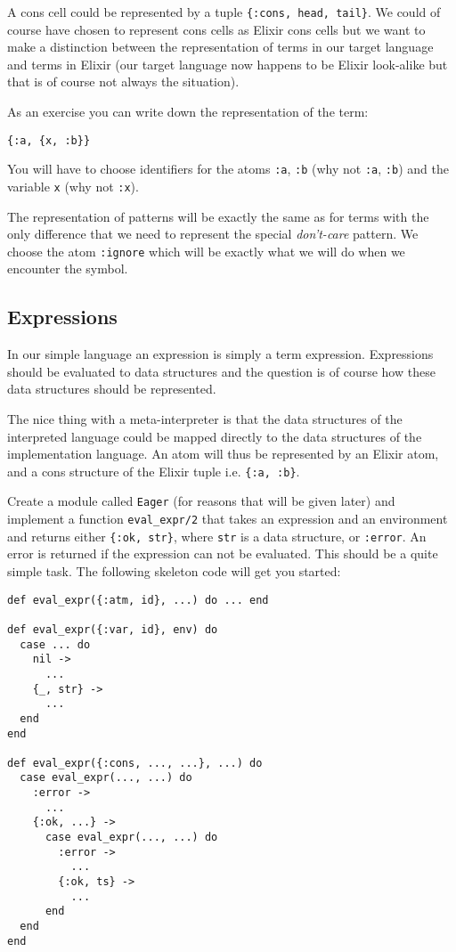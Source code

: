 \documentclass[a4paper,11pt]{article}
\begin{document}
A cons cell could be represented by a tuple {\tt \{:cons, head,
  tail\}}. We could of course have chosen to represent cons cells as
Elixir cons cells but we want to make a distinction between the
representation of terms in our target language and terms in Elixir (our
target language now happens to be Elixir look-alike but that is of
course not always the situation).

As an exercise you can write down the representation of the term:

\begin{verbatim}
{:a, {x, :b}}
\end{verbatim}

You will have to choose identifiers for the atoms {\tt :a}, {\tt :b}
(why not {\tt :a}, {\tt :b}) and the variable {\tt x} (why
not {\tt :x}).

The representation of patterns will be exactly the same as for terms
with the only difference that we need to represent the special {\em
  don't-care} pattern. We choose the atom {\tt :ignore} which will be
exactly what we will do when we encounter the symbol.

\subsection{Expressions}
In our simple language an expression is simply a term
expression. Expressions should be evaluated to data structures and the
question is of course how these data structures should be represented.

The nice thing with a meta-interpreter is that the data structures of
the interpreted language could be mapped directly to the data
structures of the implementation language. An atom will thus be
represented by an Elixir atom, and a cons structure of the Elixir tuple
 i.e. {\tt \{:a, :b\}}. 

Create a module called {\tt Eager} (for reasons that will be given
later) and implement a function {\tt eval\_expr/2} that takes an
expression and an environment and returns either {\tt \{:ok, str\}},
where {\tt str} is a data structure, or {\tt :error}. An error is
returned if the expression can not be evaluated. This should be a
quite simple task. The following skeleton code will get you started:

\begin{verbatim}
def eval_expr({:atm, id}, ...) do ... end

def eval_expr({:var, id}, env) do
  case ... do
    nil ->
      ...
    {_, str} ->
      ...
  end
end

def eval_expr({:cons, ..., ...}, ...) do
  case eval_expr(..., ...) do
    :error ->
      ...
    {:ok, ...} ->
      case eval_expr(..., ...) do
        :error ->
          ...
        {:ok, ts} ->
          ...
      end
  end
end
\end{verbatim}
\end{document}
